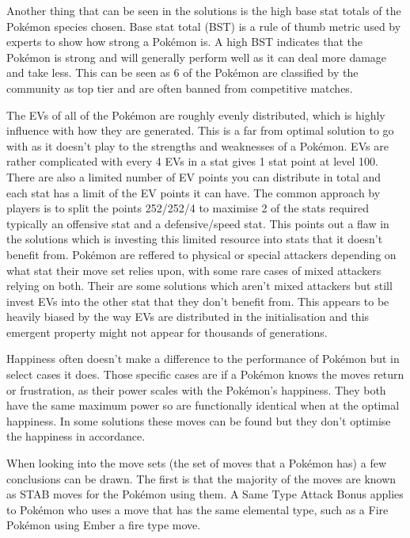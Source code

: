 \documentclass[a4paper]{article}
\newcommand{\Pokemon}{Pok\'{e}mon}
\begin{document}
\par
Another thing that can be seen in the solutions is the high base stat totals of the \Pokemon{} species chosen.
Base stat total (BST) is a rule of thumb metric used by experts to show how strong a \Pokemon{} is.
A high BST indicates that the \Pokemon{} is strong and will generally perform well as it can deal more damage and take less.
This can be seen as 6 of the \Pokemon{} are classified by the community as top tier and are often banned from competitive matches.
\par
The EVs of all of the \Pokemon{} are roughly evenly distributed, which is highly influence with how they are generated.
This is a far from optimal solution to go with as it doesn't play to the strengths and weaknesses of a \Pokemon{}.
EVs are rather complicated with every 4 EVs in a stat gives 1 stat point at level 100.
There are also a limited number of EV points you can distribute in total and each stat has a limit of the EV points it can have.
The common approach by players is to split the points 252/252/4 to maximise 2 of the stats required typically an offensive stat and a defensive/speed stat.
This points out a flaw in the solutions which is investing this limited resource into stats that it doesn't benefit from.
\Pokemon{} are reffered to physical or special attackers depending on what stat their move set relies upon, with some rare cases of mixed attackers relying on both.
Their are some solutions which aren't mixed attackers but still invest EVs into the other stat that they don't benefit from.
This appears to be heavily biased by the way EVs are distributed in the initialisation and this emergent property might not appear for thousands of generations.
\par
Happiness often doesn't make a difference to the performance of \Pokemon{} but in select cases it does.
Those specific cases are if a \Pokemon{} knows the moves return or frustration, as their power scales with the \Pokemon{}'s happiness.
They both have the same maximum power so are functionally identical when at the optimal happiness.
In some solutions these moves can be found but they don't optimise the happiness in accordance.
\par
When looking into the move sets (the set of moves that a \Pokemon{} has) a few conclusions can be drawn.
The first is that the majority of the moves are known as STAB moves for the \Pokemon{} using them.
A Same Type Attack Bonus applies to \Pokemon{} who uses a move that has the same elemental type, such as a Fire \Pokemon{} using Ember a fire type move.
\end{document}

